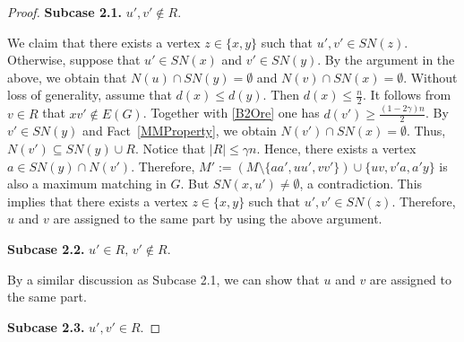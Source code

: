 \documentclass[11pt, a4paper]{article}
\theoremstyle{definition}
\newcommand{\<}{\subseteq}
\begin{document}
\begin{proof}
\medskip
{\bf Subcase 2.1.} $u',v'\notin R$.
\medskip

We claim that there exists a vertex $z\in \{x,y\}$ such that 
$
u',v'\in SN(z).
$ 
Otherwise, suppose that $u'\in SN(x)$ and $v'\in SN(y)$. By the argument in the above,  we obtain that $N(u)\cap SN(y)=\emptyset$ and $N(v)\cap SN(x)=\emptyset$. %
Without loss of generality, assume that $d(x)\le d(y)$. Then $d(x)\le \frac{n}{2}$. It follows from $v\in R$ that $xv'\notin E(G)$. Together with  \eqref{B2Ore} one has $d(v')\geq \frac{(1-2\gamma)n}{2}$. By $v'\in SN(y)$ and Fact~\ref{MMProperty}, we obtain $N(v')\cap SN(x)=\emptyset$. Thus,  $N(v')\subseteq SN(y)\cup R$. Notice that $|R|\leq \gamma n$.  Hence, there exists a vertex $a\in SN(y)\cap N(v')$. Therefore, $M':=(M\setminus \{aa',uu',vv'\})\cup \{uv,v'a,a'y\}$ is also a maximum matching in $G$. But $SN(x,u')\neq \emptyset$, a contradiction. This implies that there exists a vertex $z\in \{x,y\}$ such that 
$
u',v'\in SN(z). 
$
Therefore, $u$ and $v$ are assigned to the same part by using the above argument. 


\medskip
{\bf Subcase 2.2.} $u'\in R,\,v'\notin R$.
\medskip

By a similar discussion as Subcase 2.1, we can show that $u$ and $v$ are assigned to the same part. %

\medskip
{\bf Subcase 2.3.} $u',v'\in R$.
\medskip


\end{proof}
\end{document}
